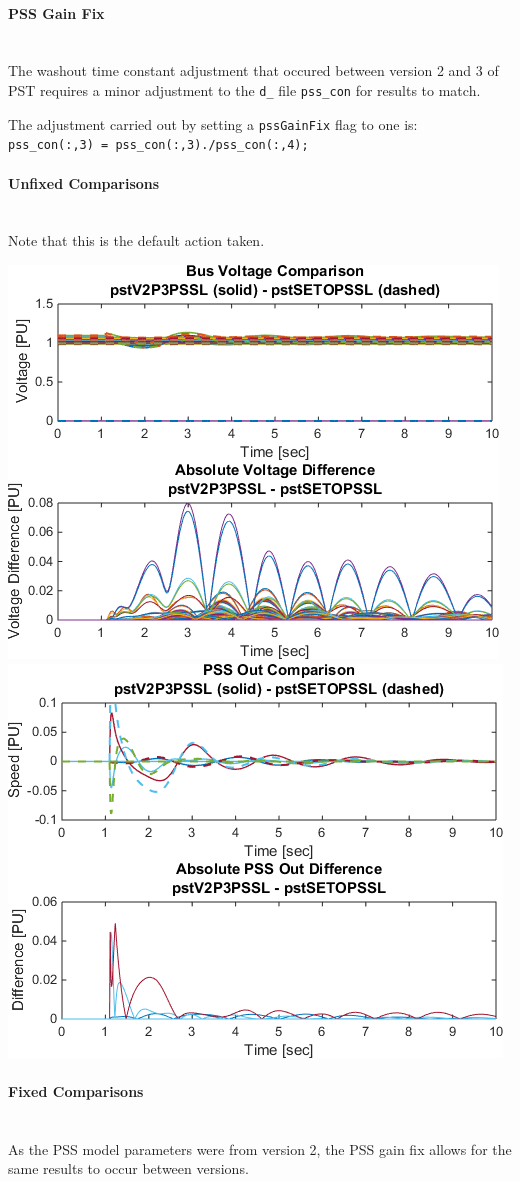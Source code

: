 \documentclass[12pt]{article}
\begin{document}
\onehalfspacing
\paragraph{PSS Gain Fix} \ \\
The washout time constant adjustment that occured between version 2 and 3 of PST requires a minor adjustment to the \verb|d_| file \verb|pss_con| for results to match.

The adjustment carried out by setting a \verb|pssGainFix| flag to one is: \\ \verb|pss_con(:,3) = pss_con(:,3)./pss_con(:,4);|

\paragraph{Unfixed Comparisons} \ \\
Note that this is the default action taken. 

\includegraphics[width=.5\linewidth]{pstV2P3PSSLpstSETOPSSLBusV} %
\includegraphics[width=.5\linewidth]{pstV2P3PSSLpstSETOPSSLPSSout}

\paragraph{Fixed Comparisons}\ \\
As the PSS model parameters were from version 2, the PSS gain fix allows for the same results to occur between versions.
\end{document}
